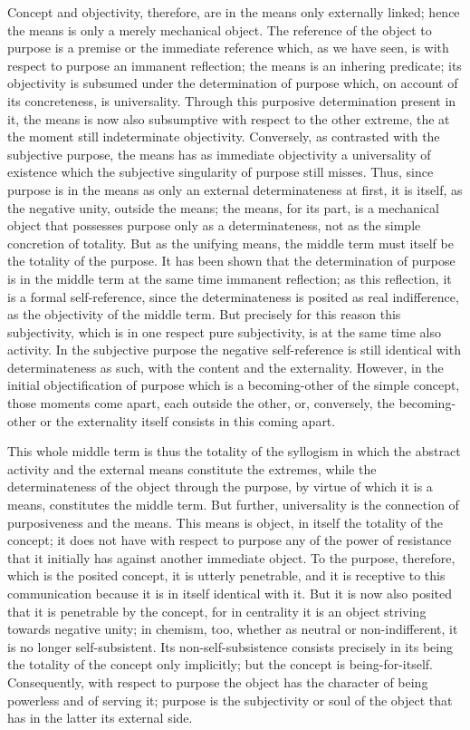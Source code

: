 Concept and objectivity, therefore,
are in the means only externally linked;
hence the means is only a merely mechanical object.
The reference of the object to purpose is
a premise or the immediate reference
which, as we have seen,
is with respect to purpose an immanent reflection;
the means is an inhering predicate;
its objectivity is subsumed under
the determination of purpose which,
on account of its concreteness, is universality.
Through this purposive determination present in it,
the means is now also subsumptive
with respect to the other extreme,
the at the moment still indeterminate objectivity.
Conversely, as contrasted with the subjective purpose,
the means has as immediate objectivity a universality of
existence which the subjective singularity of purpose still misses.
Thus, since purpose is in the means as
only an external determinateness at first,
it is itself, as the negative unity, outside the means;
the means, for its part, is a mechanical object
that possesses purpose only as a determinateness,
not as the simple concretion of totality.
But as the unifying means,
the middle term must itself be
the totality of the purpose.
It has been shown that the
determination of purpose is in the middle term
at the same time immanent reflection;
as this reflection, it is a formal self-reference,
since the determinateness is posited as real indifference,
as the objectivity of the middle term.
But precisely for this reason this subjectivity,
which is in one respect pure subjectivity,
is at the same time also activity.
In the subjective purpose the
negative self-reference is
still identical with determinateness as such,
with the content and the externality.
However, in the initial objectification of purpose
which is a becoming-other of the simple concept,
those moments come apart, each outside the other,
or, conversely, the becoming-other
or the externality itself consists in this coming apart.

This whole middle term is thus
the totality of the syllogism
in which the abstract activity
and the external means
constitute the extremes,
while the determinateness of
the object through the purpose,
by virtue of which it is a means,
constitutes the middle term.
But further, universality is
the connection of purposiveness and the means.
This means is object,
in itself the totality of the concept;
it does not have with respect to purpose
any of the power of resistance
that it initially has against
another immediate object.
To the purpose, therefore,
which is the posited concept,
it is utterly penetrable,
and it is receptive to this communication
because it is in itself identical with it.
But it is now also posited that
it is penetrable by the concept,
for in centrality it is an object
striving towards negative unity;
in chemism, too, whether as neutral or non-indifferent,
it is no longer self-subsistent.
Its non-self-subsistence consists
precisely in its being the
totality of the concept only implicitly;
but the concept is being-for-itself.
Consequently, with respect to purpose
the object has the character of being
powerless and of serving it;
purpose is the subjectivity or soul of the object
that has in the latter its external side.

